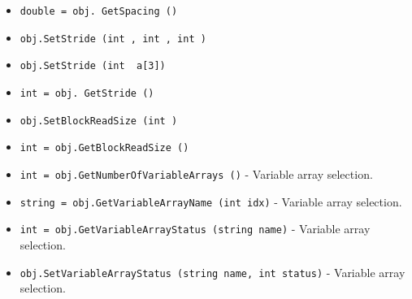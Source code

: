 \begin{itemize}
\item  \verb|double = obj. GetSpacing ()|

\item  \verb|obj.SetStride (int , int , int )|

\item  \verb|obj.SetStride (int  a[3])|

\item  \verb|int = obj. GetStride ()|

\item  \verb|obj.SetBlockReadSize (int )|

\item  \verb|int = obj.GetBlockReadSize ()|

\item  \verb|int = obj.GetNumberOfVariableArrays ()| -  Variable array selection.

\item  \verb|string = obj.GetVariableArrayName (int idx)| -  Variable array selection.

\item  \verb|int = obj.GetVariableArrayStatus (string name)| -  Variable array selection.

\item  \verb|obj.SetVariableArrayStatus (string name, int status)| -  Variable array selection.

\end{itemize}
